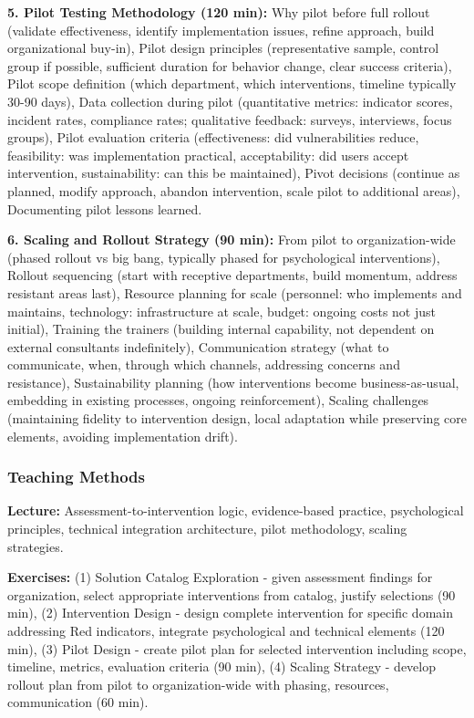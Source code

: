 \documentclass[11pt,a4paper]{article}
\begin{document}
\textbf{5. Pilot Testing Methodology (120 min):} Why pilot before full rollout (validate effectiveness, identify implementation issues, refine approach, build organizational buy-in), Pilot design principles (representative sample, control group if possible, sufficient duration for behavior change, clear success criteria), Pilot scope definition (which department, which interventions, timeline typically 30-90 days), Data collection during pilot (quantitative metrics: indicator scores, incident rates, compliance rates; qualitative feedback: surveys, interviews, focus groups), Pilot evaluation criteria (effectiveness: did vulnerabilities reduce, feasibility: was implementation practical, acceptability: did users accept intervention, sustainability: can this be maintained), Pivot decisions (continue as planned, modify approach, abandon intervention, scale pilot to additional areas), Documenting pilot lessons learned.

\textbf{6. Scaling and Rollout Strategy (90 min):} From pilot to organization-wide (phased rollout vs big bang, typically phased for psychological interventions), Rollout sequencing (start with receptive departments, build momentum, address resistant areas last), Resource planning for scale (personnel: who implements and maintains, technology: infrastructure at scale, budget: ongoing costs not just initial), Training the trainers (building internal capability, not dependent on external consultants indefinitely), Communication strategy (what to communicate, when, through which channels, addressing concerns and resistance), Sustainability planning (how interventions become business-as-usual, embedding in existing processes, ongoing reinforcement), Scaling challenges (maintaining fidelity to intervention design, local adaptation while preserving core elements, avoiding implementation drift).

\subsubsection{Teaching Methods}

\textbf{Lecture:} Assessment-to-intervention logic, evidence-based practice, psychological principles, technical integration architecture, pilot methodology, scaling strategies.

\textbf{Exercises:} (1) Solution Catalog Exploration - given assessment findings for organization, select appropriate interventions from catalog, justify selections (90 min), (2) Intervention Design - design complete intervention for specific domain addressing Red indicators, integrate psychological and technical elements (120 min), (3) Pilot Design - create pilot plan for selected intervention including scope, timeline, metrics, evaluation criteria (90 min), (4) Scaling Strategy - develop rollout plan from pilot to organization-wide with phasing, resources, communication (60 min).
\end{document}
